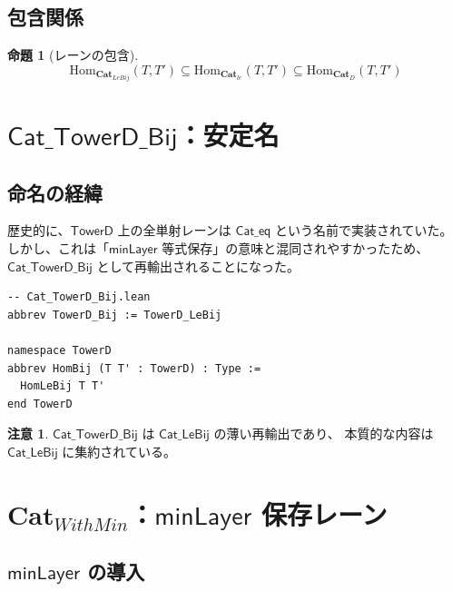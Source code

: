 \documentclass[a4paper,11pt]{ltjsarticle}
\theoremstyle{definition}
\newtheorem{remark}[definition]{注意}
\theoremstyle{plain}
\newtheorem{proposition}[definition]{命題}
\newcommand{\Hom}{\mathrm{Hom}}
\newcommand{\CatD}{\mathbf{Cat}_D}
\newcommand{\Catle}{\mathbf{Cat}_{le}}
\newcommand{\CatLeBij}{\mathbf{Cat}_{LeBij}}
\newcommand{\CatWithMin}{\mathbf{Cat}_{WithMin}}
\newcommand{\TowerD}{\mathsf{TowerD}}
\newcommand{\minLayer}{\mathsf{minLayer}}
\begin{document}
\subsection{包含関係}

\begin{proposition}[レーンの包含]
\[
  \Hom_{\CatLeBij}(T, T') \subseteq \Hom_{\Catle}(T, T') \subseteq \Hom_{\CatD}(T, T')
\]
\end{proposition}

\section{$\mathsf{Cat\_TowerD\_Bij}$：安定名}
\label{sec:cat-tower-d-bij}

\subsection{命名の経緯}

歴史的に、$\TowerD$ 上の全単射レーンは $\mathsf{Cat\_eq}$ という名前で実装されていた。
しかし、これは「$\minLayer$ 等式保存」の意味と混同されやすかったため、
$\mathsf{Cat\_TowerD\_Bij}$ として再輸出されることになった。

\begin{leancode}
\begin{lstlisting}
-- Cat_TowerD_Bij.lean
abbrev TowerD_Bij := TowerD_LeBij

namespace TowerD
abbrev HomBij (T T' : TowerD) : Type :=
  HomLeBij T T'
end TowerD
\end{lstlisting}
\end{leancode}

\begin{remark}
$\mathsf{Cat\_TowerD\_Bij}$ は $\mathsf{Cat\_LeBij}$ の薄い再輸出であり、
本質的な内容は $\mathsf{Cat\_LeBij}$ に集約されている。
\end{remark}

\section{$\CatWithMin$：$\minLayer$ 保存レーン}
\label{sec:cat-with-min}

\subsection{$\minLayer$ の導入}
\end{document}
